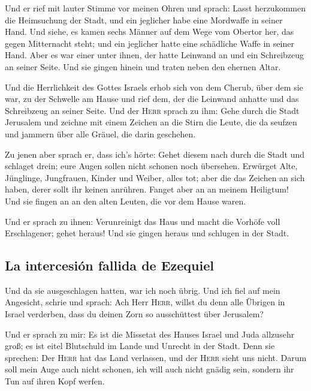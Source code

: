  Und er rief mit lauter Stimme vor meinen Ohren und
sprach: Lasst herzukommen die Heimsuchung der Stadt, und ein jeglicher
habe eine Mordwaffe in seiner Hand.  Und siehe, es kamen
sechs Männer auf dem Wege vom Obertor her, das gegen Mitternacht steht;
und ein jeglicher hatte eine schädliche Waffe in seiner Hand. Aber es
war einer unter ihnen, der hatte Leinwand an und ein Schreibzeug an
seiner Seite. Und sie gingen hinein und traten neben den ehernen Altar.

 Und die Herrlichkeit des Gottes Israels erhob sich von
dem Cherub, über dem sie war, zu der Schwelle am Hause und rief dem, der
die Leinwand anhatte und das Schreibzeug an seiner Seite. 
Und der \textsc{Herr} sprach zu ihm: Gehe durch die Stadt Jerusalem und
zeichne mit einem Zeichen an die Stirn die Leute, die da seufzen und
jammern über alle Gräuel, die darin geschehen.

 Zu jenen aber sprach er, dass ich's hörte: Gehet diesem
nach durch die Stadt und schlaget drein; eure Augen sollen nicht schonen
noch übersehen.  Erwürget Alte, Jünglinge, Jungfrauen,
Kinder und Weiber, alles tot; aber die das Zeichen an sich haben, derer
sollt ihr keinen anrühren. Fanget aber an an meinem Heiligtum! Und sie
fingen an an den alten Leuten, die vor dem Hause waren.

 Und er sprach zu ihnen: Verunreinigt das Haus und macht
die Vorhöfe voll Erschlagener; gehet heraus! Und sie gingen heraus und
schlugen in der Stadt.

\hypertarget{la-intercesiuxf3n-fallida-de-ezequiel}{%
\subsection{La intercesión fallida de
Ezequiel}\label{la-intercesiuxf3n-fallida-de-ezequiel}}

 Und da sie ausgeschlagen hatten, war ich noch übrig. Und
ich fiel auf mein Angesicht, schrie und sprach: Ach Herr \textsc{Herr},
willst du denn alle Übrigen in Israel verderben, dass du deinen Zorn so
ausschüttest über Jerusalem?

 Und er sprach zu mir: Es ist die Missetat des Hauses
Israel und Juda allzusehr groß; es ist eitel Blutschuld im Lande und
Unrecht in der Stadt. Denn sie sprechen: Der \textsc{Herr} hat das Land
verlassen, und der \textsc{Herr} sieht uns nicht.  Darum
soll mein Auge auch nicht schonen, ich will auch nicht gnädig sein,
sondern ihr Tun auf ihren Kopf werfen.

